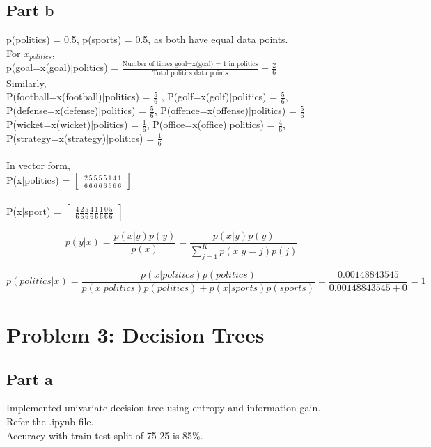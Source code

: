 \documentclass[12pt]{article}
\begin{document}
\subsection*{Part b}
p(politics) = 0.5, p(sports) = 0.5, as both have equal data points.\\
For $x_{politics}$, \\
p(goal=x(goal)$|$politics) = $\frac{\text{Number of times goal=x(goal) = 1 in politics}}{\text{Total politics data points}} = \frac{2}{6} $ \\
Similarly, \\ 
P(football=x(football)$|$politics) = $\frac{5}{6}$ , P(golf=x(golf)$|$politics) = $\frac{5}{6}$, P(defense=x(defense)$|$politics) = $\frac{5}{6}$, P(offence=x(offense)$|$politics) = $\frac{5}{6}$ \\
P(wicket=x(wicket)$|$politics) = $\frac{1}{6}$, P(office=x(office)$|$politics) = $\frac{4}{6}$, P(strategy=x(strategy)$|$politics) = $\frac{1}{6}$ \\
\\
In vector form, \\
P(x$|$politics) = $\begin{bmatrix} \frac{2}{6}  \frac{5}{6}  \frac{5}{6}  \frac{5}{6} \frac{5}{6}  \frac{1}{6}  \frac{4}{6}  \frac{1}{6} \end{bmatrix}$
\\
\\
P(x$|$sport) = $\begin{bmatrix} \frac{4}{6}  \frac{2}{6}  \frac{5}{6}  \frac{4}{6}  \frac{1}{6} \frac{1}{6}  \frac{0}{6}  \frac{5}{6} \end{bmatrix}$

\begin{equation*}
    p(y|x) = \frac{p(x|y)p(y)}{p(x)} = \frac{p(x|y)p(y)}{\sum_{j=1}^{K} p(x|y=j)p(j)}
\end{equation*}

\begin{equation*}
    p(politics|x) = \frac{p(x|politics)p(politics)}{p(x|politics)p(politics) + p(x|sports)p(sports)} = \frac{0.00148843545}{0.00148843545 + 0} = 1
\end{equation*}

\section*{Problem 3: Decision Trees}
\subsection*{Part a}
Implemented univariate decision tree using entropy and information gain.\\
Refer the .ipynb file. \\
Accuracy with train-test split of 75-25 is 85\%. 
\end{document}
